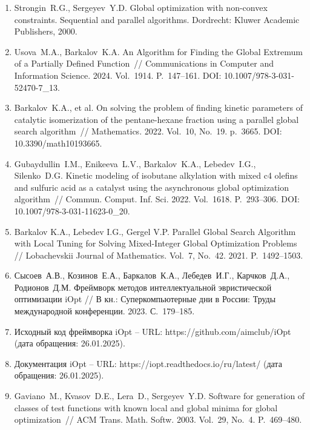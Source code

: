 \documentclass[a4paper,12pt,russian]{article}
\begin{document}
\begin{enumerate}
\item \label{rfa:rulit:Strongin2000}
Strongin~R.G., Sergeyev~Y.D. Global optimization with non-convex constraints. Sequential and parallel algorithms. Dordrecht: Kluwer Academic Publishers, 2000.


\item \label{rfa:rulit:Usova2024}
Usova~M.A., Barkalov~K.A. An Algorithm for Finding the Global Extremum of a Partially Defined Function~//
Communications in Computer and Information Science. 2024. Vol.~1914. P.~147--161. DOI: 10.1007/978-3-031-52470-7{\_}13.


\item \label{rfa:rulit:Barkalov2022}
Barkalov~K.A., et al. On solving the problem of finding kinetic parameters of catalytic isomerization of the pentane-hexane fraction using a parallel global search algorithm~// 
Mathematics. 2022. Vol.~10, No.~19. p.~3665. DOI: 10.3390/math10193665.

\item \label{rfa:rulit:Gubaydullin2022}
Gubaydullin~I.M., Enikeeva~L.V., Barkalov~K.A., Lebedev~I.G., Silenko~D.G. Kinetic modeling of isobutane alkylation with mixed c4 olefins and sulfuric acid as a catalyst using the asynchronous global optimization algorithm~//
Commun. Comput. Inf. Sci. 2022. Vol.~1618. P.~293--306. DOI: 10.1007/978-3-031-11623-0{\_}20.

\item \label{rfa:rulit:Barkalov2021}
Barkalov K.A., Lebedev I.G., Gergel V.P. Parallel Global Search Algorithm with Local Tuning for Solving Mixed-Integer Global Optimization Problems // Lobachevskii Journal of Mathematics. Vol.~7, No.~42. 2021. P.~1492--1503.

\item \label{rfa:rulit:iOptPaper}
Сысоев~А.В., Козинов~Е.А., Баркалов~К.А., Лебедев~И.Г., Карчков~Д.А., Родионов~Д.М. Фреймворк методов интеллектуальной эвристической оптимизации iOpt // В кн.: Суперкомпьютерные дни в России: Труды международной конференции. 2023. С.~179--185.

\item \label{rfa:rulit:iOptGithub}
Исходный код фреймворка iOpt -- URL: https://github.com/aimclub/iOpt (дата обращения: 26.01.2025).

\item \label{rfa:rulit:iOptDocs}
Документация iOpt -- URL: https://iopt.readthedocs.io/ru/latest/ (дата обращения: 26.01.2025).


\item \label{rfa:rulit:Gaviano2003}
Gaviano~M., Kvasov~D.E., Lera~D., Sergeyev~Y.D. Software for generation of classes of test functions with known local and global minima for global optimization~// ACM Trans. Math. Softw. 2003. Vol.~29, No.~4. P.~469--480.


\end{enumerate}
\end{document}
